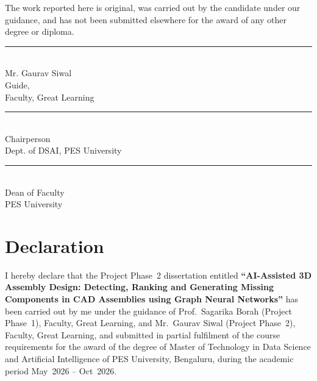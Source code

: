 \documentclass[12pt,oneside,a4paper]{report}
\begin{document}
The work reported here is original, was carried out by the candidate under
our guidance, and has not been submitted elsewhere for the award of any other
degree or diploma.

\vspace{2.5cm}

\begin{center}
\begin{minipage}[t]{0.48\textwidth}
\centering
\vspace*{1.5cm}%
\rule{5cm}{0.4pt}\\
Mr. Gaurav Siwal\\
Guide,\\
Faculty, Great Learning
\end{minipage}
\end{center}

\vspace{2cm}

\noindent
\begin{minipage}[t]{0.48\textwidth}
\centering
\vspace*{1.5cm}%
\rule{5cm}{0.4pt}\\
Chairperson\\
Dept. of DSAI, PES University
\end{minipage}
\hfill
\begin{minipage}[t]{0.48\textwidth}
\centering
\vspace*{1.5cm}%
\rule{5cm}{0.4pt}\\
Dean of Faculty\\
PES University
\end{minipage}

\chapter*{Declaration}
\thispagestyle{plain}

I hereby declare that the Project Phase~2 dissertation entitled
\textbf{``AI-Assisted 3D Assembly Design: Detecting, Ranking and Generating
Missing Components in CAD Assemblies using Graph Neural Networks''} has been
carried out by me under the guidance of Prof.~Sagarika Borah (Project
Phase~1), Faculty, Great Learning, and Mr.~Gaurav Siwal (Project Phase~2),
Faculty, Great Learning, and submitted in partial
fulfilment of the course requirements for the award of the degree of Master
of Technology in Data Science and Artificial Intelligence of PES University,
Bengaluru, during the academic period May~2026 -- Oct~2026.
\end{document}
